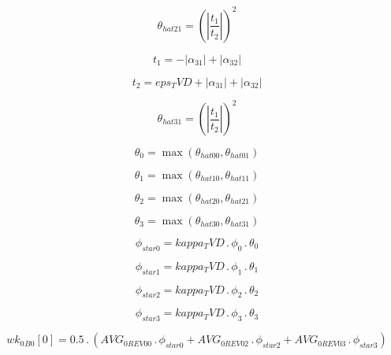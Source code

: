 \documentclass{article}
\begin{document}
\begin{dmath}\theta_{hat 21} = \left(\left|{\frac{t_{1}}{t_{2}}}\right| \right)^{2}\end{dmath}

\begin{dmath}t_{1} = - \left|{\alpha_{31}}\right| + \left|{\alpha_{32}}\right|\end{dmath}

\begin{dmath}t_{2} = eps_TVD + \left|{\alpha_{31}}\right| + \left|{\alpha_{32}}\right|\end{dmath}

\begin{dmath}\theta_{hat 31} = \left(\left|{\frac{t_{1}}{t_{2}}}\right| \right)^{2}\end{dmath}

\begin{dmath}\theta_{0} = \max\left(\theta_{hat 00}, \theta_{hat 01}\right)\end{dmath}

\begin{dmath}\theta_{1} = \max\left(\theta_{hat 10}, \theta_{hat 11}\right)\end{dmath}

\begin{dmath}\theta_{2} = \max\left(\theta_{hat 20}, \theta_{hat 21}\right)\end{dmath}

\begin{dmath}\theta_{3} = \max\left(\theta_{hat 30}, \theta_{hat 31}\right)\end{dmath}

\begin{dmath}\phi_{star 0} = kappa_TVD \,.\, \phi_{0} \,.\, \theta_{0}\end{dmath}

\begin{dmath}\phi_{star 1} = kappa_TVD \,.\, \phi_{1} \,.\, \theta_{1}\end{dmath}

\begin{dmath}\phi_{star 2} = kappa_TVD \,.\, \phi_{2} \,.\, \theta_{2}\end{dmath}

\begin{dmath}\phi_{star 3} = kappa_TVD \,.\, \phi_{3} \,.\, \theta_{3}\end{dmath}

\begin{dmath}{wk_{0}{_{B0}}}[{0}] = 0.5 \,.\, \left(AVG_{0 REV 00} \,.\, \phi_{star 0} + AVG_{0 REV 02} \,.\, \phi_{star 2} + AVG_{0 REV 03} \,.\, \phi_{star 3}\right)\end{dmath}
\end{document}
